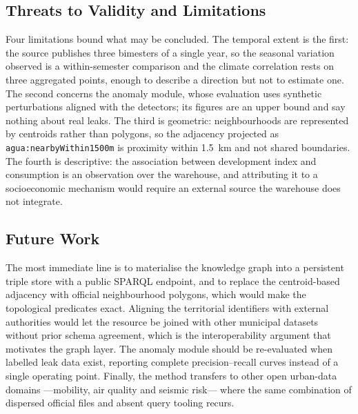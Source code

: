 \documentclass[runningheads]{llncs}
\newif\ifmarcarcambios
\newcommand{\icokg}[1]{\ifmarcarcambios\textcolor{nuevo}{#1}\else#1\fi}
\newenvironment{icokgblock}{\ifmarcarcambios\color{nuevo}\fi}{}
\renewcommand{\_}{\origunderscore\allowbreak}
\begin{document}
\begin{icokgblock}
\subsection{Threats to Validity and Limitations}

Four limitations bound what may be concluded. The temporal extent is the first:
the source publishes three bimesters of a single year, so the seasonal variation
observed is a within-semester comparison and the climate correlation rests on
three aggregated points, enough to describe a direction but not to estimate one.
The second concerns the anomaly module, whose evaluation uses synthetic
perturbations aligned with the detectors; its figures are an upper bound and say
nothing about real leaks. The third is geometric: neighbourhoods are represented
by centroids rather than polygons, so the adjacency projected as
\icokg{\texttt{agua:nearbyWithin1500m}} is proximity within 1.5~km and not shared boundaries. The
fourth is descriptive: the association between development index and consumption
is an observation over the warehouse, and attributing it to a socioeconomic
mechanism would require an external source the warehouse does not
integrate.

\subsection{Future Work}

The most immediate line is to materialise the knowledge graph into a persistent
triple store with a public SPARQL endpoint, and to replace the centroid-based
adjacency with official neighbourhood polygons, which would make the topological
predicates exact. Aligning the territorial identifiers with external authorities
would let the resource be joined with other municipal datasets without prior
schema agreement, which is the interoperability argument that motivates the graph
layer. The anomaly module should be re-evaluated when labelled leak data exist,
reporting complete precision--recall curves instead of a single operating point.
Finally, the method transfers to other open urban-data domains ---mobility, air
quality and seismic risk--- where the same combination of dispersed official
files and absent query tooling recurs.
\end{icokgblock}
\end{document}
